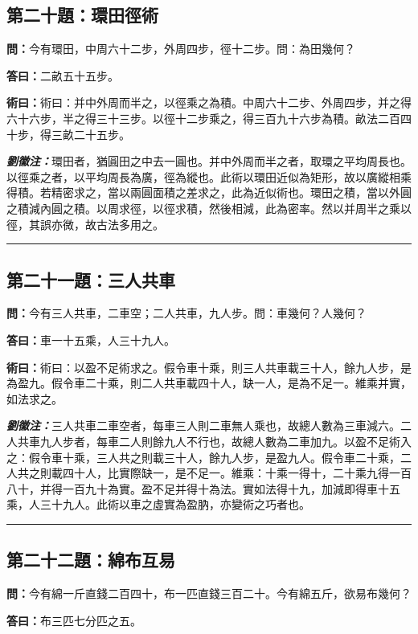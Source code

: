 \documentclass[11pt,a4paper]{article}
\newcommand{\wen}[1]{\textbf{\color{problemcolor}問：}#1\par}
\newcommand{\da}[1]{\textbf{答曰：}#1\par}
\newcommand{\shu}[1]{\textbf{術曰：}#1\par}
\newcommand{\liuhui}[1]{{\color{commentarycolor}\textit{\textbf{劉徽注：}}#1\par}}
\begin{document}
\subsection{第二十題：環田徑術}

\wen{今有環田，中周六十二步，外周四步，徑十二步。問：為田幾何？}

\da{二畝五十五步。}

\shu{術曰：并中外周而半之，以徑乘之為積。中周六十二步、外周四步，并之得六十六步，半之得三十三步。以徑十二步乘之，得三百九十六步為積。畝法二百四十步，得三畝二十五步。}

\liuhui{環田者，猶圓田之中去一圓也。并中外周而半之者，取環之平均周長也。以徑乘之者，以平均周長為廣，徑為縱也。此術以環田近似為矩形，故以廣縱相乘得積。若精密求之，當以兩圓面積之差求之，此為近似術也。環田之積，當以外圓之積減內圓之積。以周求徑，以徑求積，然後相減，此為密率。然以并周半之乘以徑，其誤亦微，故古法多用之。}

\bigskip
\hrule
\bigskip

\subsection{第二十一題：三人共車}

\wen{今有三人共車，二車空；二人共車，九人步。問：車幾何？人幾何？}

\da{車一十五乘，人三十九人。}

\shu{術曰：以盈不足術求之。假令車十乘，則三人共車載三十人，餘九人步，是為盈九。假令車二十乘，則二人共車載四十人，缺一人，是為不足一。維乘并實，如法求之。}

\liuhui{三人共車二車空者，每車三人則二車無人乘也，故總人數為三車減六。二人共車九人步者，每車二人則餘九人不行也，故總人數為二車加九。以盈不足術入之：假令車十乘，三人共之則載三十人，餘九人步，是盈九人。假令車二十乘，二人共之則載四十人，比實際缺一，是不足一。維乘：十乘一得十，二十乘九得一百八十，并得一百九十為實。盈不足并得十為法。實如法得十九，加減即得車十五乘，人三十九人。此術以車之虛實為盈肭，亦變術之巧者也。}

\bigskip
\hrule
\bigskip

\subsection{第二十二題：綿布互易}

\wen{今有綿一斤直錢二百四十，布一匹直錢三百二十。今有綿五斤，欲易布幾何？}

\da{布三匹七分匹之五。}
\end{document}
